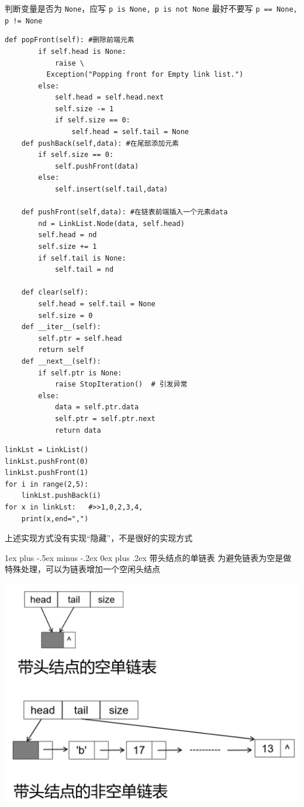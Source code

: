 \documentclass[10pt,UTF8,a4paper]{ctexart}
\makeatletter
\renewcommand{\subsubsection}{\@startsection{subsubsection}{3}{0mm}%
                                {1ex plus -.5ex minus -.2ex}%
                                {0ex plus .2ex}%
                                {\normalfont\small\bfseries}}
\makeatother
\begin{document}
\begin{multicols}{3}
判断变量是否为 \verb|None|，应写 \verb|p is None, p is not None|
最好不要写 \verb|p == None, p != None|

\begin{lstlisting}[style=python]
	def popFront(self): #删除前端元素
		if self.head is None:
			raise \ 
		  Exception("Popping front for Empty link list.")
		else:
			self.head = self.head.next
			self.size -= 1
			if self.size == 0:
				self.head = self.tail = None
	def pushBack(self,data): #在尾部添加元素
		if self.size == 0:
			self.pushFront(data)
		else:
			self.insert(self.tail,data)

	def pushFront(self,data): #在链表前端插入一个元素data
		nd = LinkList.Node(data, self.head)
		self.head = nd
		self.size += 1
		if self.tail is None:
			self.tail = nd

	def clear(self):
		self.head = self.tail = None
		self.size = 0
	def __iter__(self):
		self.ptr = self.head
		return self
	def __next__(self):
		if self.ptr is None:
			raise StopIteration()  # 引发异常
		else:
			data = self.ptr.data
			self.ptr = self.ptr.next
			return data

\end{lstlisting}

\begin{lstlisting}[style=python]
linkLst = LinkList()
linkLst.pushFront(0)
linkLst.pushFront(1)
for i in range(2,5):
	linkLst.pushBack(i)
for x in linkLst:	#>>1,0,2,3,4,
	print(x,end=",")

\end{lstlisting}
上述实现方式没有实现“隐藏”，不是很好的实现方式

\subsubsection{带头结点的单链表}
为避免链表为空是做特殊处理，可以为链表增加一个空闲头结点

\includegraphics[width=.8\columnwidth]{images/头结点单链表.png}


\end{multicols}
\end{document}
